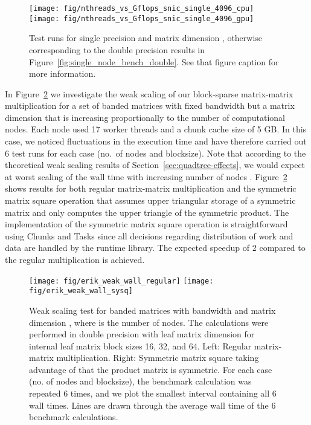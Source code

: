 \documentclass{elsarticle}
\begin{document}
\begin{figure}
  \begin{center}
    \texttt{[image: fig/nthreads\_vs\_Gflops\_snic\_single\_4096\_cpu]}
    \texttt{[image: fig/nthreads\_vs\_Gflops\_snic\_single\_4096\_gpu]}
  \end{center}
  \caption{Test runs for single precision and matrix dimension , otherwise corresponding to the double precision
    results in Figure~\ref{fig:single_node_bench_double}. See that
    figure caption for more
    information. \label{fig:single_node_bench_single}}
\end{figure}

In Figure~\ref{fig:weak_scaling_erik} we investigate the weak scaling
of our block-sparse matrix-matrix multiplication for a set of banded matrices with
fixed bandwidth but a matrix dimension that is increasing proportionally to the
number of computational nodes.
Each node used 17 worker threads and a chunk cache size of 5 GB.
In this case, we noticed fluctuations
in the execution time and have therefore carried out 6 test runs for
each case (no.~of nodes and blocksize). 
Note that according to the theoretical weak scaling results of
Section~\ref{sec:quadtree-effects}, we would expect at worst  scaling of the wall time with increasing number of nodes .
Figure~\ref{fig:weak_scaling_erik} shows results for both regular matrix-matrix multiplication and
the symmetric matrix square
operation that assumes upper triangular storage of a symmetric matrix
and only computes the upper triangle of the symmetric product. The
implementation of
the symmetric matrix square
operation is straightforward using Chunks and
Tasks since all decisions regarding distribution of work and data are
handled by the runtime library.  The expected speedup of 2
compared to the regular multiplication is achieved.


\begin{figure}
  \begin{center}
    \texttt{[image: fig/erik\_weak\_wall\_regular]}
    \texttt{[image: fig/erik\_weak\_wall\_sysq]}
  \end{center}
  \caption{Weak scaling test for banded matrices with bandwidth  and matrix dimension , where
     is the number of nodes.  The calculations were performed in
    double precision with leaf matrix dimension  for
    internal leaf matrix block sizes 16, 32, and 64.  Left: Regular
    matrix-matrix multiplication. Right: Symmetric matrix square
    taking advantage of that the product matrix is symmetric.  For
    each case (no. of nodes and blocksize), the benchmark calculation
    was repeated 6 times, and we plot the smallest interval containing
    all 6 wall times.  Lines are drawn through the average
    wall time of the 6 benchmark calculations.  \label{fig:weak_scaling_erik}}
\end{figure}
\end{document}
